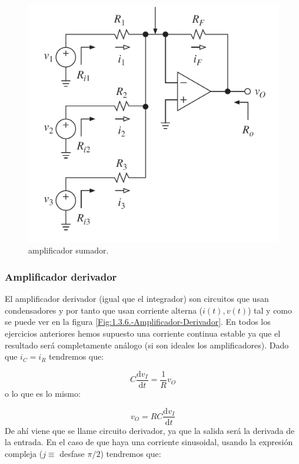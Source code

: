 \documentclass[12pt,a4paper]{article}
\numberwithin{equation}{section}
\numberwithin{figure}{section}
\newcommand{\D}{\mathrm{d}}
\begin{document}
\begin{figure}[h!] \centering
\includegraphics[scale=0.4]{1.5-Amplificador-sumador.png}
\caption{amplificador sumador.}
\label{Fig:1.3.5.-Amplificador-Sumador}
\end{figure} 

\subsubsection{Amplificador derivador}
El amplificador derivador (igual que el integrador) son circuitos que usan condensadores y por tanto que usan corriente alterna ($i(t),v(t)$) tal y como se puede ver en la figura \ref{Fig:1.3.6.-Amplificador-Derivador}. En todos los ejercicios anteriores hemos supuesto una corriente continua estable ya que el resultado será completamente análogo (si son ideales los amplificadores). Dado que $i_C=i_R$ tendremos que:

\begin{equation}
C \dfrac{\D v_I}{\D t} = \dfrac{1}{R}  v_O 
\end{equation}
o lo que es lo mismo:

\begin{equation}
v_O = RC \dfrac{\D v_I}{\D t}
\end{equation}
De ahí viene que se llame circuito derivador, ya que la salida será la derivada de la entrada. En el caso de que haya una corriente sinusoidal, usando la expresión compleja ($j \equiv $ desfase $\pi/2$) tendremos que:
\end{document}
